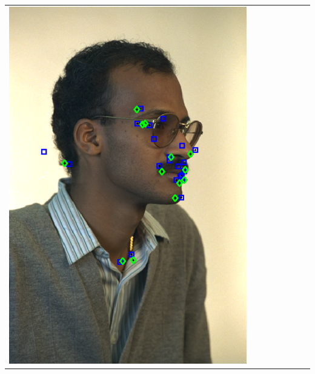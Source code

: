 \documentclass[portrait,final,a0paper,fontscale=0.277]{baposter}
\begin{document}
\begin{poster}
{{\begin{tabular}{@{}rccccccc@{}}
\parbox[c]{0.11\linewidth}{\includegraphics[width=\linewidth]{images/l_hr_fail.pdf}} &

\end{tabular}}}
\end{poster}
\end{document}
